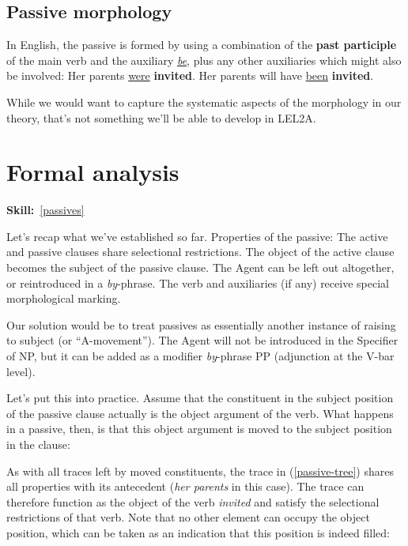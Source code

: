 \documentclass{article}
\begin{document}
    \subsection{Passive morphology}
In English, the passive is formed by using a combination of the \textbf{past participle} of the main verb and the auxiliary \uline{\emph{be}}, plus any other auxiliaries which might also be involved:
\ea
    \ea Her parents \uline{were} \textbf{invited}.
    \ex Her parents will have \uline{been} \textbf{invited}.
    \z
\z

While we would want to capture the systematic aspects of the morphology in our theory, that's not something we'll be able to develop in LEL2A.

\section{Formal analysis}
\hfill{}\textbf{Skill:}~\ref{passives}

Let's recap what we've established so far.
\ea Properties of the passive:
    \ea The active and passive clauses share selectional restrictions.
    \ex The object of the active clause becomes the subject of the passive clause.
    \ex The Agent can be left out altogether, or reintroduced in a \emph{by}-phrase.
    \ex The verb and auxiliaries (if any) receive special morphological marking.
    \z
\z

Our solution would be to treat passives as essentially another instance of raising to subject (or ``A-movement''). The Agent will not be introduced in the Specifier of NP, but it can be added as a modifier \emph{by}-phrase PP (adjunction at the V-bar level).

Let's put this into practice. Assume that the constituent in the subject position of the passive clause actually is the object argument of the verb.
What happens in a passive, then, is that this object argument is moved to the subject position in the clause:
\begin{exe}
    \label{passive-tree}
\end{exe}
\vspace{-2em}
As with all traces left by moved constituents, the trace in (\ref{passive-tree}) shares all properties with its antecedent (\emph{her parents} in this case).
The trace can therefore function as the object of the verb \emph{invited} and satisfy the selectional restrictions of that verb.
Note that no other element can occupy the object position, which can be taken as an indication that this position is indeed filled:
\begin{exe}
    \label{her_parents}
\end{exe}
\end{document}
